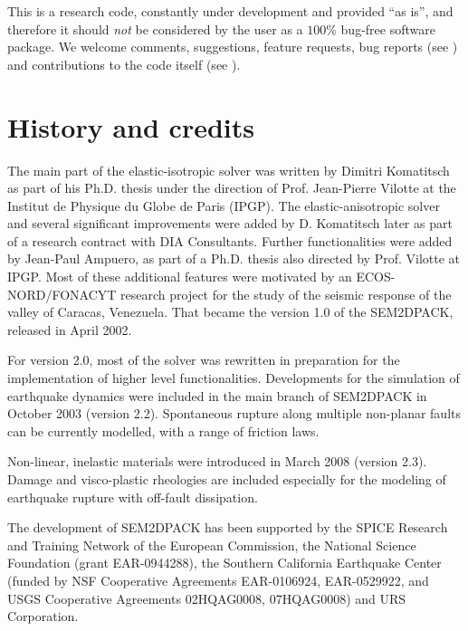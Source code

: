 This is a research code, constantly under development and provided ``as is'', 
and therefore it should {\em not\/} be considered by the user
as a $100\%$ bug-free software package.
We welcome comments, suggestions, feature requests, bug reports (see )
and contributions to the code itself (see ).

\section{History and credits}

The main part of the elastic-isotropic solver was written by
Dimitri Komatitsch as part of his Ph.D. thesis \cite{Kom97} 
under the direction of Prof. Jean-Pierre Vilotte
at the Institut de Physique du Globe de Paris (IPGP).
The elastic-anisotropic solver and several significant
improvements were added by D. Komatitsch
later as part of a research contract with DIA Consultants.
Further functionalities were added by Jean-Paul Ampuero, 
as part of a Ph.D. thesis \cite{Amp02} also directed by Prof. Vilotte at IPGP.
Most of these additional features were motivated by an ECOS-NORD/FONACYT 
research project for the study of the 
seismic response of the valley of Caracas, Venezuela.
That became the version 1.0 of the SEM2DPACK, released in April 2002.

For version 2.0, most of the solver was rewritten 
in preparation for the implementation of higher level functionalities.
Developments for the simulation of earthquake dynamics \cite{Amp02} 
were included in the main branch of SEM2DPACK in October 2003 (version 2.2). 
Spontaneous rupture along multiple non-planar faults can be currently modelled,
with a range of friction laws.

Non-linear, inelastic materials were introduced in March 2008 (version 2.3). 
Damage and visco-plastic rheologies are included especially
for the modeling of earthquake rupture with off-fault dissipation.

The development of SEM2DPACK has been supported
by the SPICE Research and Training Network of the European Commission,
the National Science Foundation (grant EAR-0944288),
the Southern California Earthquake Center
(funded by NSF Cooperative Agreements EAR-0106924, EAR-0529922, 
and USGS Cooperative Agreements 02HQAG0008, 07HQAG0008)
and URS Corporation.

